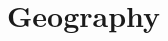\documentclass[../my_knowledge.tex]{subfiles}
\begin{document}
\chapter{Geography}

\newpage
\minitoc
\newpage


\end{document}

